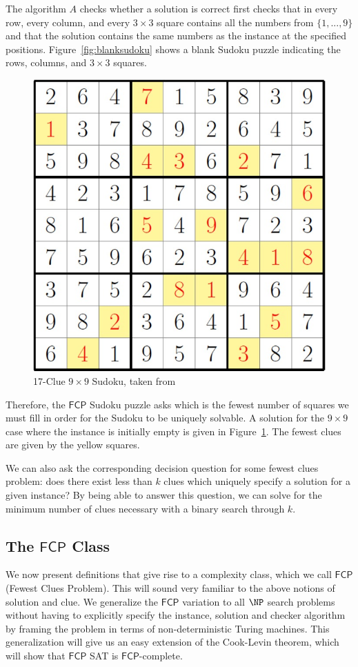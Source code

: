 \documentclass[runningheads,a4paper]{llncs}
\begin{document}
The algorithm $A$ checks whether a solution is correct first checks that in every row, every column, and every $3 \times 3$ square contains all the numbers from $\{1 , ..., 9\}$ and that the solution contains the same numbers as the instance at the specified positions. Figure~\ref{fig:blanksudoku} shows a blank Sudoku puzzle indicating the rows, columns, and $3 \times 3$ squares.

\begin{figure}
\centering
\label{fig:seventeencluesudoku}
\includegraphics[width=0.5\linewidth]{seventeencluesudoku.jpg}
\caption{17-Clue $9 \times 9$ Sudoku, taken from \cite{smallsudoku}}
\end{figure}

Therefore, the $\mathsf{FCP}$ Sudoku puzzle asks which is the fewest number of squares we must fill in order for the Sudoku to be uniquely solvable. A solution for the $9 \times 9$ case where the instance is initially empty is given in Figure~\ref{fig:seventeencluesudoku}. The fewest clues are given by the yellow squares.

We can also ask the corresponding decision question for some fewest clues problem: does there exist less than $k$ clues which uniquely specify a solution for a given instance? By being able to answer this question, we can solve for the minimum number of clues necessary with a binary search through $k$.

\subsection{The $\mathsf{FCP}$ Class}

We now present definitions that give rise to a complexity class, which we call  $\mathsf{FCP}$ (Fewest Clues Problem). This will sound very familiar to the above notions of solution and clue. We generalize the $\mathsf{FCP}$ variation to all $\NP$ search problems without having to explicitly specify the instance, solution and checker algorithm by framing the problem in terms of non-deterministic Turing machines. This generalization will give us an easy extension of the Cook-Levin theorem, which will show that $\mathsf{FCP}$ SAT is $\mathsf{FCP}$-complete.
\end{document}
